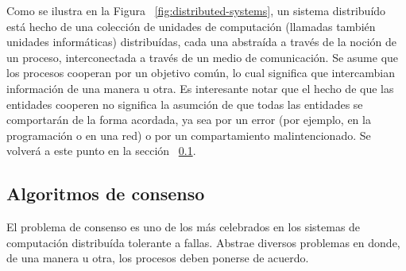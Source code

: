 Como se ilustra en la Figura ~\ref{fig:distributed-systems}, un sistema distribuído está hecho de una
colección de unidades de computación (llamadas también unidades informáticas) distribuídas, cada una
abstraída a través de la noción de un proceso, interconectada a través de un medio de comunicación.
Se asume que los procesos cooperan por un objetivo común, lo cual significa que intercambian
información de una manera u otra. Es interesante notar que el hecho de que las entidades
cooperen no significa la asumción de que todas las entidades se comportarán de la forma
acordada, ya sea por un error (por ejemplo, en la programación o en una red) o por un compartamiento
malintencionado. Se volverá a este punto en la sección ~\ref{subsubsec:consensus}.



\subsection{Algoritmos de consenso}\label{subsubsec:consensus}
El problema de consenso es uno de los más celebrados en los sistemas de computación distribuída tolerante a fallas.
%
Abstrae diversos problemas en donde, de una manera u otra, los procesos deben ponerse de acuerdo.
%

